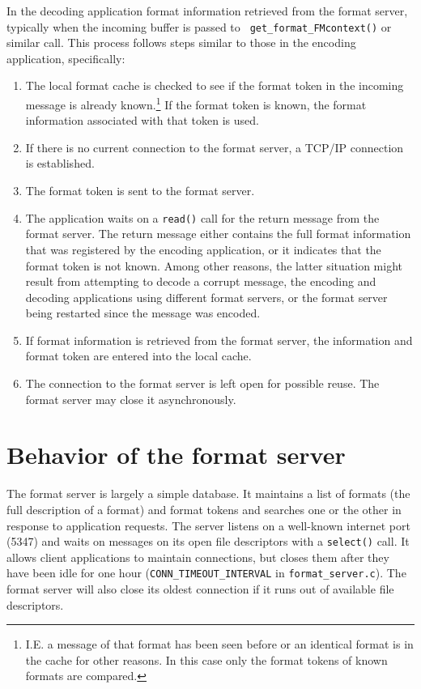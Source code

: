 \documentclass{article}
\begin{document}
In the decoding application format information retrieved from the format
server, typically when the incoming buffer is passed to {\tt
get\_format\_FMcontext()} or similar call.  This process follows steps
similar to those in the encoding application, specifically:
\begin{enumerate}
\item The local format cache is checked to see if the format token in the
incoming message is already known.\footnote{I.E. a message of that format
has been seen before or an identical format is in the cache for other
reasons.  In this case only the format tokens of known formats are
compared.}  If the format token is known, the format information associated
with that token is used.
\item If there is no current connection to the format server, a TCP/IP
connection is established.
\item The format token is sent to the format server.
\item The application waits on a {\tt read()} call for the return message
from the format server.  The return message either contains the full format
information that was registered by the encoding application, or it indicates
that the format token is not known.  Among other reasons, the latter
situation might result from attempting to decode a corrupt message, the
encoding and decoding applications using different format servers, or the
format server being restarted since the message was encoded.
\item If format information is retrieved from the format server, the
information and format token are entered into the local cache. 
\item The connection to the format server is left open for possible reuse.
The format server may close it asynchronously.
\end{enumerate}

\section{Behavior of the format server}
The format server is largely a simple database.  It maintains a list of
formats (the full description of a format) and format tokens and searches
one or the other in response to application requests.  The server listens on
a well-known internet port (5347) and waits on messages on its open file
descriptors with a {\tt select()} call.  It allows client applications to
maintain connections, but closes them after they have been idle for one hour
({\tt CONN\_TIMEOUT\_INTERVAL} in {\tt format\_server.c}).  The format
server will also close its oldest connection if it runs out of available
file descriptors.
\end{document}
